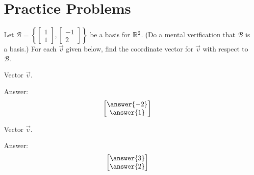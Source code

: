 \documentclass{ximera}
\begin{document}
\section*{Practice Problems}
\begin{problem}
Let $\mathcal{B}=\left\{\begin{bmatrix}1\\1\end{bmatrix},\begin{bmatrix}-1\\2\end{bmatrix}\right\}$ be a basis for $\mathbb{R}^2$.  (Do a mental verification that $\mathcal{B}$ is a basis.)  For each $\vec{v}$ given below, find the coordinate vector for $\vec{v}$ with respect to $\mathcal{B}$.
  \begin{problem}
 Vector $\vec{v}$. 
  \begin{image}[2in]
\end{image}

Answer:
$$\begin{bmatrix}\answer{-2}\\\answer{1}\end{bmatrix}$$
  \end{problem}
  
  \begin{problem}
  Vector $\vec{v}$.
  \begin{image}[1.5in]
\end{image}
Answer:
$$\begin{bmatrix}\answer{3}\\\answer{2}\end{bmatrix}$$
  \end{problem}
\end{problem}
\end{document}
